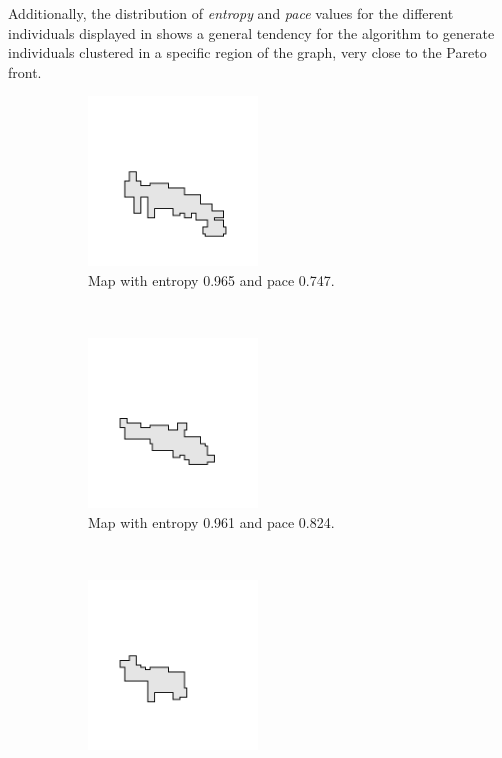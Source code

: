 Additionally, the distribution of \textit{entropy} and \textit{pace} values for the different individuals displayed in  shows a general tendency for the algorithm to generate individuals clustered in a specific region of the graph, very close to the Pareto front.

\begin{figure}[hbtp]
    \centering
    \begin{subfigure}[t]{0.3\textwidth}
        \centering
        \includegraphics[height=4.5cm]{Images/images/experiment_two/best_entropy_pop_0/map.png}
        \caption{Map with entropy 0.965 and pace 0.747.}
        \label{fig:ex_two_best_entropy_map_0}
    \end{subfigure}%
    ~ 
    \begin{subfigure}[t]{0.3\textwidth}
        \centering
        \includegraphics[height=4.5cm]{Images/images/experiment_two/best_fitness_pop_0/map.png}
        \caption{Map with entropy 0.961 and pace 0.824.}    
        \label{fig:ex_two_best_fitness_map_0}
    \end{subfigure}
    ~ 
    \begin{subfigure}[t]{0.3\textwidth}
        \centering
        \includegraphics[height=4.5cm]{Images/images/experiment_two/best_pace_pop_0/map.png}

\end{subfigure}
\end{figure}
